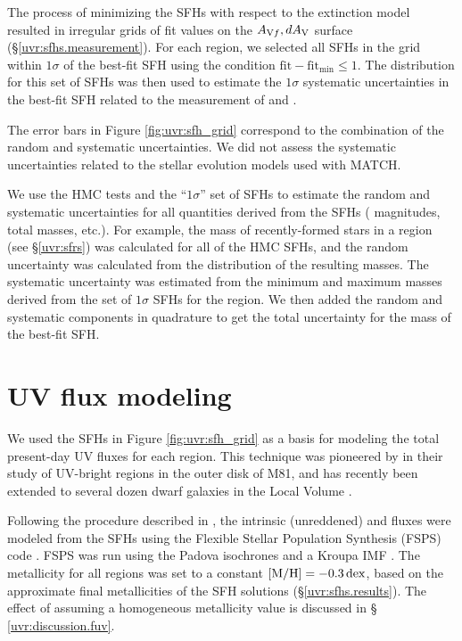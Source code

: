 The process of minimizing the SFHs with respect to the extinction model
resulted in irregular grids of fit values on the
$A_{\mathrm{V}f},dA_\mathrm{V}$ surface (\S \ref{uvr:sfhs.measurement}). For each
region, we selected all SFHs in the grid within $1\sigma$ of the best-fit SFH
using the condition $\mathrm{fit-fit_{min}} \le 1$. The distribution for this
set of SFHs was then used to estimate the $1\sigma$ systematic uncertainties in
the best-fit SFH related to the measurement of \avf{} and
\dav{}.

The error bars in Figure \ref{fig:uvr:sfh_grid} correspond to the combination of
the random and systematic uncertainties. We did not assess the systematic
uncertainties related to the stellar evolution models used with MATCH.

We use the HMC tests and the ``$1\sigma$'' set of SFHs to estimate the random
and systematic uncertainties for all quantities derived from the SFHs (\fuv{}
magnitudes, total masses, etc.). For example, the mass of recently-formed stars
in a region (see \S \ref{uvr:sfrs}) was calculated for all of the HMC SFHs, and the
random uncertainty was calculated from the distribution of the resulting
masses. The systematic uncertainty was estimated from the minimum and maximum
masses derived from the set of $1\sigma$ SFHs for the region. We then added the
random and systematic components in quadrature to get the total uncertainty for
the mass of the best-fit SFH.





\section{UV flux modeling}\label{uvr:fluxmod}

We used the SFHs in Figure \ref{fig:uvr:sfh_grid} as a basis for modeling the total
present-day UV fluxes for each region. This technique was pioneered by
\citet{Gogarten:2009} in their study of UV-bright regions in the outer disk of
M81, and has recently been extended to several dozen dwarf galaxies in the
Local Volume \citep{Johnson:2013}.

Following the procedure described in \citet{Johnson:2013}, the intrinsic
(unreddened) \fuv{} and \nuv{} fluxes were modeled from the SFHs using the Flexible
Stellar Population Synthesis (FSPS) code \citep{Conroy:2009, Conroy:2010}. FSPS was
run using the Padova isochrones \citep{Girardi:2010} and a Kroupa IMF
\citep{Kroupa:2001}. The metallicity for all regions was set to a constant
$\mathrm{[M/H]} = -0.3\,\mathrm{dex}$, based on the approximate final
metallicities of the SFH solutions (\S \ref{uvr:sfhs.results}). The effect of
assuming a homogeneous metallicity value is discussed in \S
\ref{uvr:discussion.fuv}.

